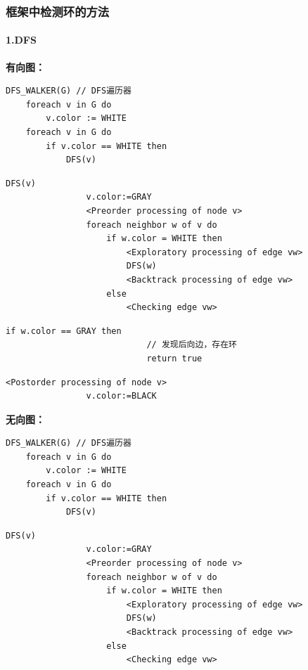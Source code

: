 \documentclass{article}
\begin{document}
\pagebreak

\subsubsection{框架中检测环的方法}

\paragraph{1.DFS\\}
\textbf{有向图：\\}

\begin{lstlisting}[style=algorithm]
    DFS_WALKER(G) // DFS遍历器
    foreach v in G do
        v.color := WHITE
    foreach v in G do
        if v.color == WHITE then
            DFS(v)
\end{lstlisting}

\begin{lstlisting}[style=algorithmPPT]
            DFS(v)
                v.color:=GRAY
                <Preorder processing of node v>
                foreach neighbor w of v do
                    if w.color = WHITE then
                        <Exploratory processing of edge vw>
                        DFS(w)
                        <Backtrack processing of edge vw>              
                    else
                        <Checking edge vw>
                \end{lstlisting}  

\begin{lstlisting}[style=algorithm]
                        if w.color == GRAY then
                            // 发现后向边，存在环
                            return true
                        \end{lstlisting}

\begin{lstlisting}[style=algorithmPPT]
                <Postorder processing of node v>
                v.color:=BLACK
            \end{lstlisting}

\pagebreak

\textbf{无向图：\\}
\begin{lstlisting}[style=algorithm]
    DFS_WALKER(G) // DFS遍历器
    foreach v in G do
        v.color := WHITE
    foreach v in G do
        if v.color == WHITE then
            DFS(v)
\end{lstlisting}

\begin{lstlisting}[style=algorithmPPT]
            DFS(v)
                v.color:=GRAY
                <Preorder processing of node v>
                foreach neighbor w of v do
                    if w.color = WHITE then
                        <Exploratory processing of edge vw>
                        DFS(w)
                        <Backtrack processing of edge vw>              
                    else
                        <Checking edge vw>
                \end{lstlisting}  
\end{document}
